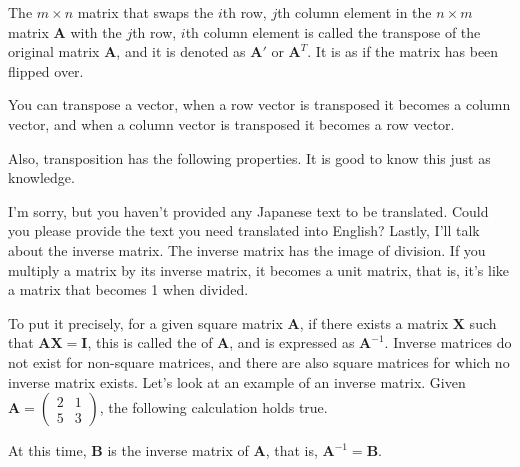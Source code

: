 \documentclass{ltjsbook}
\begin{document}
The $m \times n$ matrix that swaps the $i$th row, $j$th column element in the $n \times m$ matrix $\bm{A}$ with the $j$th row, $i$th column element is called the transpose of the original matrix $\bm{A}$, and it is denoted as $\bm{A}'$ or $\bm{A}^T$. It is as if the matrix has been flipped over.




You can transpose a vector, when a row vector is transposed it becomes a column vector, and when a column vector is transposed it becomes a row vector.



Also, transposition has the following properties. It is good to know this just as knowledge.


I'm sorry, but you haven't provided any Japanese text to be translated. Could you please provide the text you need translated into English?
Lastly, I'll talk about the inverse matrix. The inverse matrix has the image of division. If you multiply a matrix by its inverse matrix, it becomes a unit matrix, that is, it's like a matrix that becomes 1 when divided.

To put it precisely, for a given square matrix $\bm{A}$, if there exists a matrix $\bm{X}$ such that $\bm{A}\bm{X}=\bm{I}$, this is called the  of $\bm{A}$, and is expressed as $\bm{A}^{-1}$. Inverse matrices do not exist for non-square matrices, and there are also square matrices for which no inverse matrix exists. Let's look at an example of an inverse matrix.
Given $\bm{A}=\begin{pmatrix}2&1\\5&3\end{pmatrix}$, the following calculation holds true.

At this time, $\bm{B}$ is the inverse matrix of $\bm{A}$, that is, $\bm{A}^{-1}=\bm{B}$.
\end{document}
